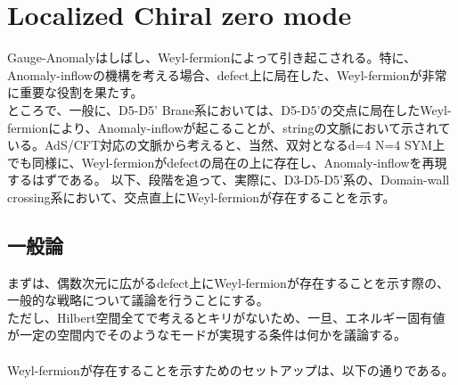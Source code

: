 \documentclass[dvipdfmx,a4paper,10.5pt]{article}
\numberwithin{equation}{section}
\begin{document}
\section{Localized Chiral zero mode}
Gauge-Anomalyはしばし、Weyl-fermionによって引き起こされる。特に、Anomaly-inflowの機構を考える場合、defect上に局在した、Weyl-fermionが非常に重要な役割を果たす。\\
ところで、一般に、D5-D5' Brane系においては、D5-D5'の交点に局在したWeyl-fermionにより、Anomaly-inflowが起こることが、stringの文脈において示されている。AdS/CFT対応の文脈から考えると、当然、双対となるd=4 N=4 SYM上でも同様に、Weyl-fermionがdefectの局在の上に存在し、Anomaly-inflowを再現するはずである。
以下、段階を追って、実際に、D3-D5-D5'系の、Domain-wall crossing系において、交点直上にWeyl-fermionが存在することを示す。

\subsection{一般論}
まずは、偶数次元に広がるdefect上にWeyl-fermionが存在することを示す際の、一般的な戦略について議論を行うことにする。\\
ただし、Hilbert空間全てで考えるとキリがないため、一旦、エネルギー固有値が一定の空間内でそのようなモードが実現する条件は何かを議論する。\\
\\
Weyl-fermionが存在することを示すためのセットアップは、以下の通りである。
\end{document}
